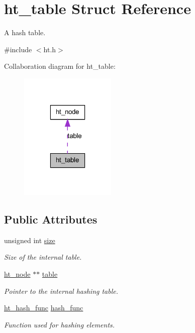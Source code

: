 \hypertarget{structht__table}{
\section{ht\_\-table Struct Reference}
\label{structht__table}
}


A hash table.  




{\ttfamily \#include $<$ht.h$>$}



Collaboration diagram for ht\_\-table:
\nopagebreak
\begin{figure}[H]
\begin{center}
\leavevmode
\includegraphics[width=130pt]{structht__table__coll__graph}
\end{center}
\end{figure}
\subsection*{Public Attributes}
\begin{DoxyCompactItemize}
\item 
unsigned int \hyperlink{structht__table_a493b0baf20b4274a08b5451e61f8e5f4}{size}
\begin{DoxyCompactList}\small\item\em Size of the internal table. \item\end{DoxyCompactList}\item 
\hyperlink{structht__node}{ht\_\-node} $\ast$$\ast$ \hyperlink{structht__table_ae739f6f0d8b6cd6f55337ae7d0761dfc}{table}
\begin{DoxyCompactList}\small\item\em Pointer to the internal hashing table. \item\end{DoxyCompactList}\item 
\hyperlink{ht_8h_a91a8d03489ef281e6f26d389c44d42cf}{ht\_\-hash\_\-func} \hyperlink{structht__table_abe53fe8d261dea812255944769d22f45}{hash\_\-func}
\begin{DoxyCompactList}\small\item\em Function used for hashing elements. \item\end{DoxyCompactList}\end{DoxyCompactItemize}


